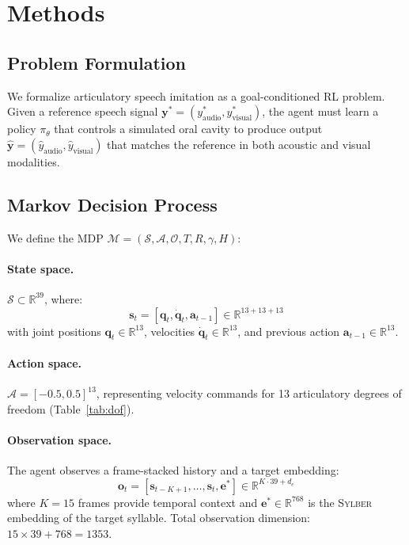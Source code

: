 \documentclass[11pt, a4paper]{article}
\newcommand{\R}{\mathbb{R}}
\newcommand{\sylber}{\textsc{Sylber}}
\begin{document}
\section{Methods}
\label{sec:methods}

\subsection{Problem Formulation}
\label{sec:problem}

We formalize articulatory speech imitation as a goal-conditioned RL problem. Given a reference speech signal $\mathbf{y}^* = (y^*_{\text{audio}}, y^*_{\text{visual}})$, the agent must learn a policy $\pi_\theta$ that controls a simulated oral cavity to produce output $\hat{\mathbf{y}} = (\hat{y}_{\text{audio}}, \hat{y}_{\text{visual}})$ that matches the reference in both acoustic and visual modalities.

\subsection{Markov Decision Process}
\label{sec:mdp}

We define the MDP $\mathcal{M} = (\mathcal{S}, \mathcal{A}, \mathcal{O}, T, R, \gamma, H)$:

\paragraph{State space.} $\mathcal{S} \subset \R^{39}$, where:
\begin{equation}
    \mathbf{s}_t = [\mathbf{q}_t, \dot{\mathbf{q}}_t, \mathbf{a}_{t-1}] \in \R^{13 + 13 + 13}
\end{equation}
with joint positions $\mathbf{q}_t \in \R^{13}$, velocities $\dot{\mathbf{q}}_t \in \R^{13}$, and previous action $\mathbf{a}_{t-1} \in \R^{13}$.

\paragraph{Action space.} $\mathcal{A} = [-0.5, 0.5]^{13}$, representing velocity commands for 13 articulatory degrees of freedom (Table~\ref{tab:dof}).

\paragraph{Observation space.} The agent observes a frame-stacked history and a target embedding:
\begin{equation}
    \mathbf{o}_t = [\mathbf{s}_{t-K+1}, \ldots, \mathbf{s}_t, \mathbf{e}^*] \in \R^{K \cdot 39 + d_e}
\end{equation}
where $K = 15$ frames provide temporal context and $\mathbf{e}^* \in \R^{768}$ is the \sylber{} embedding of the target syllable. Total observation dimension: $15 \times 39 + 768 = 1353$.
\end{document}
